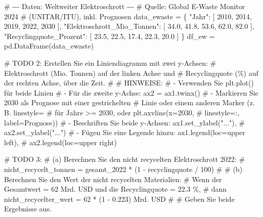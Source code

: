 \documentclass[
  nswissgerman,
  a4paper,
  DIV=11,
  numbers=noendperiod,
  ngerman]{scrreprt}
\newenvironment{Shaded}{\begin{snugshade}}{\end{snugshade}}
\newcommand{\AlertTok}[1]{\textcolor[rgb]{0.68,0.00,0.00}{#1}}
\newcommand{\CommentTok}[1]{\textcolor[rgb]{0.37,0.37,0.37}{#1}}
\newcommand{\DecValTok}[1]{\textcolor[rgb]{0.68,0.00,0.00}{#1}}
\newcommand{\FloatTok}[1]{\textcolor[rgb]{0.68,0.00,0.00}{#1}}
\newcommand{\NormalTok}[1]{\textcolor[rgb]{0.00,0.23,0.31}{#1}}
\newcommand{\OperatorTok}[1]{\textcolor[rgb]{0.37,0.37,0.37}{#1}}
\newcommand{\StringTok}[1]{\textcolor[rgb]{0.13,0.47,0.30}{#1}}
\begin{document}
\begin{Shaded}
\begin{Highlighting}[numbers=left,,]
\CommentTok{\# {-}{-}{-} Daten: Weltweiter Elektroschrott {-}{-}{-}}
\CommentTok{\# Quelle: Global E{-}Waste Monitor 2024}
\CommentTok{\# (UNITAR/ITU), inkl. Prognosen}
\NormalTok{data\_ewaste }\OperatorTok{=}\NormalTok{ \{}
    \StringTok{"Jahr"}\NormalTok{: [}
        \DecValTok{2010}\NormalTok{, }\DecValTok{2014}\NormalTok{, }\DecValTok{2019}\NormalTok{, }\DecValTok{2022}\NormalTok{, }\DecValTok{2030}
\NormalTok{    ],}
    \StringTok{"Elektroschrott\_Mio\_Tonnen"}\NormalTok{: [}
        \FloatTok{34.0}\NormalTok{, }\FloatTok{41.8}\NormalTok{, }\FloatTok{53.6}\NormalTok{, }\FloatTok{62.0}\NormalTok{, }\FloatTok{82.0}
\NormalTok{    ],}
    \StringTok{"Recyclingquote\_Prozent"}\NormalTok{: [}
        \FloatTok{23.5}\NormalTok{, }\FloatTok{22.5}\NormalTok{, }\FloatTok{17.4}\NormalTok{, }\FloatTok{22.3}\NormalTok{, }\FloatTok{20.0}
\NormalTok{    ]}
\NormalTok{\}}
\NormalTok{df\_ew }\OperatorTok{=}\NormalTok{ pd.DataFrame(data\_ewaste)}

\CommentTok{\# }\AlertTok{TODO}\CommentTok{ 2: Erstellen Sie ein Liniendiagramm mit zwei y{-}Achsen:}
\CommentTok{\# Elektroschrott (Mio. Tonnen) auf der linken Achse und}
\CommentTok{\# Recyclingquote (\%) auf der rechten Achse, über die Zeit.}
\CommentTok{\#}
\CommentTok{\# HINWEISE:}
\CommentTok{\# {-} Verwenden Sie plt.plot() für beide Linien}
\CommentTok{\# {-} Für die zweite y{-}Achse: ax2 = ax1.twinx()}
\CommentTok{\# {-} Markieren Sie 2030 als Prognose mit einer gestrichelten}
\CommentTok{\#   Linie oder einem anderen Marker (z. B. linestyle=\textquotesingle{}{-}{-}\textquotesingle{}}
\CommentTok{\#   für Jahre \textgreater{}= 2030, oder plt.axvline(x=2030,}
\CommentTok{\#   linestyle=\textquotesingle{}:\textquotesingle{}, label=\textquotesingle{}Prognose\textquotesingle{}))}
\CommentTok{\# {-} Beschriften Sie beide y{-}Achsen: ax1.set\_ylabel("..."),}
\CommentTok{\#   ax2.set\_ylabel("...")}
\CommentTok{\# {-} Fügen Sie eine Legende hinzu: ax1.legend(loc=\textquotesingle{}upper left\textquotesingle{}),}
\CommentTok{\#   ax2.legend(loc=\textquotesingle{}upper right\textquotesingle{})}


\CommentTok{\# }\AlertTok{TODO}\CommentTok{ 3:}
\CommentTok{\# (a) Berechnen Sie den nicht recycelten Elektroschrott 2022:}
\CommentTok{\#     nicht\_recycelt\_tonnen = gesamt\_2022 * (1 {-} recyclingquote / 100)}
\CommentTok{\#}
\CommentTok{\# (b) Berechnen Sie den Wert der nicht recycelten Materialien:}
\CommentTok{\#     Wenn der Gesamtwert = 62 Mrd. USD und die Recyclingquote = 22.3 \%,}
\CommentTok{\#     dann nicht\_recycelter\_wert = 62 * (1 {-} 0.223) Mrd. USD}
\CommentTok{\#}
\CommentTok{\# Geben Sie beide Ergebnisse aus.}
\end{Highlighting}
\end{Shaded}
\end{document}
